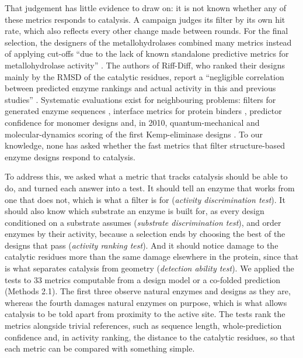 \documentclass[
  10pt,
]{article}
\DeclareRobustCommand{\_}{\textunderscore\hspace{0pt}}
\begin{document}
That judgement has
little evidence to
draw on: it is not
known whether any of
these metrics
responds to
catalysis. A
campaign judges its
filter by its own
hit rate, which also
reflects every other
change made between
rounds. For the
final selection, the
designers of the
metallohydrolases
combined many
metrics instead of
applying cut-offs
``due to the lack of
known standalone
predictive metrics
for metallohydrolase
activity''
\cite{kim2026}. The
authors of
Riff-Diff, who
ranked their designs
mainly by the RMSD
of the catalytic
residues, report a
``negligible
correlation between
predicted enzyme
rankings and actual
activity in this and
previous studies''
\cite{braun2026}.
Systematic
evaluations exist
for neighbouring
problems: filters
for generated enzyme
sequences
\cite{johnson2025},
interface metrics
for protein binders
\cite{overath2025},
predictor confidence
for monomer designs
\cite{garcia2026,korbeld2026}
and, in 2010,
quantum-mechanical
and
molecular-dynamics
scoring of the first
Kemp-eliminase
designs
\cite{kiss2010}. To
our knowledge, none
has asked whether
the fast metrics
that filter
structure-based
enzyme designs
respond to
catalysis.

To address this, we
asked what a metric
that tracks
catalysis should be
able to do, and
turned each answer
into a test. It
should tell an
enzyme that works
from one that does
not, which is what a
filter is for
(\emph{activity
discrimination
test}). It should
also know which
substrate an enzyme
is built for, as
every design
conditioned on a
substrate assumes
(\emph{substrate
discrimination
test}), and order
enzymes by their
activity, because a
selection ends by
choosing the best of
the designs that
pass (\emph{activity
ranking test}). And
it should notice
damage to the
catalytic residues
more than the same
damage elsewhere in
the protein, since
that is what
separates catalysis
from geometry
(\emph{detection
ability test}). We
applied the tests to
33 metrics
computable from a
design model or a
co-folded prediction
(Methods 2.1). The
first three observe
natural enzymes and
designs as they are,
whereas the fourth
damages natural
enzymes on purpose,
which is what allows
catalysis to be told
apart from proximity
to the active site.
The tests rank the
metrics alongside
trivial references,
such as sequence
length,
whole-prediction
confidence and, in
activity ranking,
the distance to the
catalytic residues,
so that each metric
can be compared with
something simple.
\end{document}
